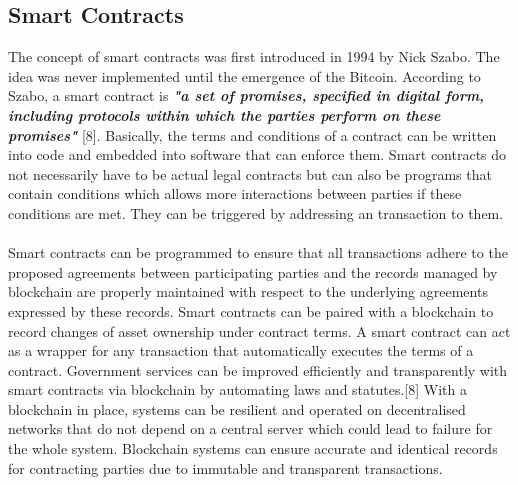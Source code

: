 \documentclass[report]{IEEEtran}
\begin{document}
 \subsection{Smart Contracts}
 The concept of smart contracts was first introduced in 1994 by Nick Szabo. The idea was never implemented until the emergence of the Bitcoin. According to Szabo, a smart contract is \textbf{\textit{"a set of promises, specified in digital form, including protocols within which the parties perform on these promises"}} [8]. Basically, the terms and conditions of a contract can be written into code and embedded into software that can enforce them. Smart contracts do not necessarily have to be actual legal contracts but can also be programs that contain conditions which allows more interactions between parties if these conditions are met. They can be triggered by addressing an transaction to them.
 \\\\ Smart contracts can be programmed to ensure that all transactions adhere to the proposed agreements between participating parties and the records managed by blockchain are properly maintained with respect to the underlying agreements expressed by these records. Smart contracts can be paired with a blockchain to record changes of asset ownership under contract terms. A smart contract can act as a wrapper for any transaction that automatically executes the terms of a contract. Government services can be improved efficiently and transparently with smart contracts via blockchain by automating laws and statutes.[8] With a blockchain in place, systems can be resilient and operated on decentralised networks that do not depend on a central server which could lead to failure for the whole system. Blockchain systems can ensure accurate and identical records for contracting parties due to immutable and transparent transactions. 
\end{document}

